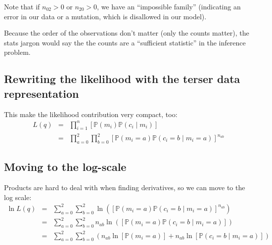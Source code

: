 \documentclass[11pt]{article}
\renewcommand{\Pr}{\mathbb{P}}
\begin{document}
Note that if $n_{02} > 0$ or $n_{20} > 0$, we have an ``impossible family'' (indicating an error in our data or a mutation, which is
disallowed in our model).

Because the order of the observations don't matter (only the counts matter), the stats jargon would
say the the counts are a ``sufficient statistic'' in the inference problem.


\subsection{Rewriting the likelihood with the terser data representation}
This make the likelihood contribution very compact, too:
\begin{eqnarray}\nonumber
  L(q) & = & \prod_{i=1}^{n}\left[\Pr\left(m_i\right)\Pr\left(c_i\mid m_i\right)\right] \\
   & = & \prod_{a=0}^{2}\prod_{b=0}^{2}\left[\Pr\left(m_i=a\right)\Pr\left(c_i=b\mid m_i=a\right)\right]^{n_{ab}}
\end{eqnarray}

\subsection{Moving to the log-scale}

Products are hard to deal with when finding derivatives, so we can move to the log scale:
\begin{eqnarray}\nonumber
 \ln L(q) & = &  \sum_{a=0}^{2}\sum_{b=0}^{2}\ln\left(\left[\Pr\left(m_i=a\right)\Pr\left(c_i=b\mid m_i=a\right)\right]^{n_{ab}}\right)\\
 & = & \sum_{a=0}^{2}\sum_{b=0}^{2}
 n_{ab}\ln\left(\left[\Pr\left(m_i=a\right)\Pr\left(c_i=b\mid m_i=a\right)\right]\right) \\
 & = & \sum_{a=0}^{2}\sum_{b=0}^{2}\left(
 n_{ab}\ln\left[\Pr\left(m_i=a\right)\right] + n_{ab}\ln\left[\Pr\left(c_i=b\mid m_i=a\right)\right] \right) 
\end{eqnarray}
\end{document}
